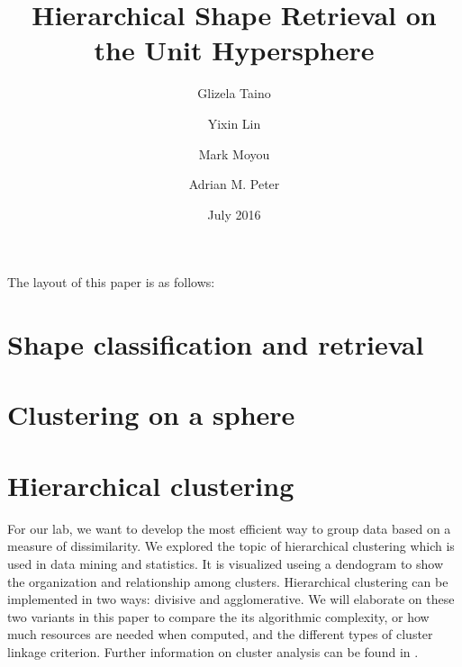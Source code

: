 \documentclass{article}
\begin{document}
\date{July 2016}

\title{Hierarchical Shape Retrieval on the Unit Hypersphere}
\author{Glizela Taino}
\author{Yixin Lin}

\author{Mark Moyou}
\author{Adrian M. Peter}
\setcounter{Maxaffil}{0}
\renewcommand\Affilfont{\small}
\maketitle



The layout of this paper is as follows:

\part{Shape classification and retrieval}
  
  
  
  

\part{Clustering on a sphere}


  
  
  
  

\part{Hierarchical clustering}

  For our lab, we want to develop the most efficient way to group data
  based on a measure of dissimilarity. We explored the topic of
  hierarchical clustering which is used in data mining and statistics.
  It is visualized useing a dendogram to show the organization and relationship
  among clusters. Hierarchical clustering can be implemented in two
  ways: divisive and agglomerative. We will elaborate on these two variants
  in this paper to compare the its algorithmic complexity, or how much
  resources are needed when computed, and the different types of cluster
  linkage criterion. Further information on cluster analysis can be
  found in \cite{ClusterAnalysis}.
\end{document}
